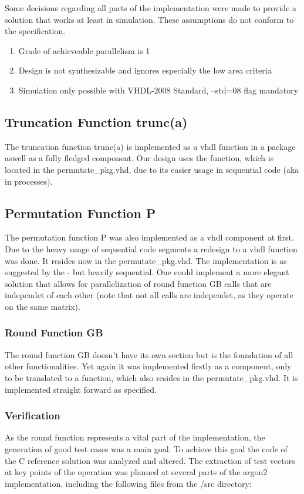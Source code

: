 Some decisions regarding all parts of the implementation were made to provide a
solution that works at least in simulation. These assumptions do not conform to the specification.

\begin{enumerate}
\item Grade of achieveable parallelism is 1
\item Design is not synthesizable and ignores especially the low area criteria
\item Simulation only possible with VHDL-2008 Standard, --std=08 flag mandatory
\end{enumerate}

\subsection{Truncation Function trunc(a)}
The truncation function trunc(a) is implemented as a vhdl function in a package aswell as a
fully fledged component. Our design uses the function, which is located in the
permutate_pkg.vhd, due to its easier usage in sequential code (aka in processes).
\subsection{Permutation Function P}
The permutation function P was also implemented as a vhdl component at first.
Due to the heavy usage of sequential code segments a redesign to a vhdl function was 
done. It resides now in the permutate_pkg.vhd.
The implementation is as suggested by the \autocite{irtf-draft} - but heavily sequential.
One could implement a more elegant solution that allows for parallelization of round
function GB calls that are independet of each other (note that not all calls are
independet, as they operate on the same matrix). 
\subsubsection{Round Function GB}
The round function GB doesn't have its own section but is the foundation of all other
functionalities. 
Yet again it was implemented firstly as a component, only to be translated to a function,
which also resides in the permutate_pkg.vhd. 
It is implemented straight forward as specified.

\subsubsection{Verification}
As the round function represents a vital part of the implementation, the generation of
good test cases was a main goal. To achieve this goal the code of the C reference solution
\autocite{argon2-github}
was analyzed and altered.
The extraction of test vectors at key points of the operation was planned at several parts
of the argon2 implementation, including the following files from the /src directory:

